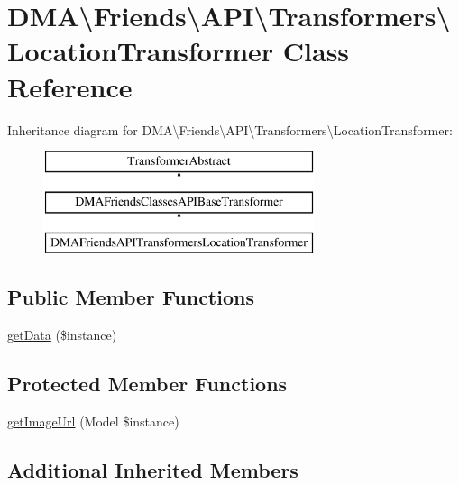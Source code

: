 \hypertarget{classDMA_1_1Friends_1_1API_1_1Transformers_1_1LocationTransformer}{}\section{D\+M\+A\textbackslash{}Friends\textbackslash{}A\+P\+I\textbackslash{}Transformers\textbackslash{}Location\+Transformer Class Reference}
\label{classDMA_1_1Friends_1_1API_1_1Transformers_1_1LocationTransformer}
Inheritance diagram for D\+M\+A\textbackslash{}Friends\textbackslash{}A\+P\+I\textbackslash{}Transformers\textbackslash{}Location\+Transformer\+:\begin{figure}[H]
\begin{center}
\leavevmode
\includegraphics[height=3.000000cm]{d9/d36/classDMA_1_1Friends_1_1API_1_1Transformers_1_1LocationTransformer}
\end{center}
\end{figure}
\subsection*{Public Member Functions}
\begin{DoxyCompactItemize}
\item 
\hyperlink{classDMA_1_1Friends_1_1API_1_1Transformers_1_1LocationTransformer_a1c6afa02557796e620042cd23acc4ab5}{get\+Data} (\$instance)
\end{DoxyCompactItemize}
\subsection*{Protected Member Functions}
\begin{DoxyCompactItemize}
\item 
\hyperlink{classDMA_1_1Friends_1_1API_1_1Transformers_1_1LocationTransformer_a455fe5c1c50b13141cc07410b2e80992}{get\+Image\+Url} (Model \$instance)
\end{DoxyCompactItemize}
\subsection*{Additional Inherited Members}


